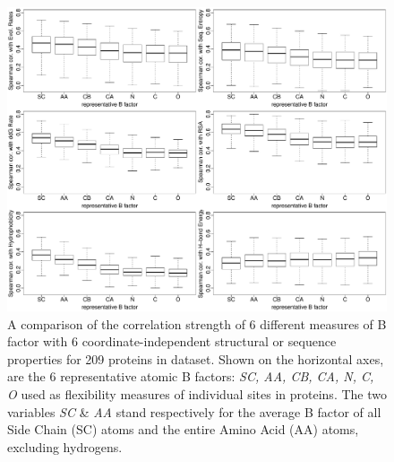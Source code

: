 \documentclass[11pt]{article}
\begin{document}
    \begin{figure}
        \begin{center}
        \includegraphics[width=5.5in]{best_bf/select_variables/boxplot_bf_all_in_one.pdf}
        \end{center}
        \caption{A comparison of the correlation strength of 6 different measures of B factor with 6 coordinate-independent structural or sequence properties for 209 proteins in dataset. Shown on the horizontal axes, are the 6 representative atomic B factors: {\it SC, AA, CB, CA, N, C, O} used as flexibility measures of individual sites in proteins. The two variables {\it SC} \& {\it AA} stand respectively for the average B factor of all Side Chain (SC) atoms and the entire Amino Acid (AA) atoms, excluding hydrogens.}
        \label{fig:best_bf}
    \end{figure}
\end{document}
